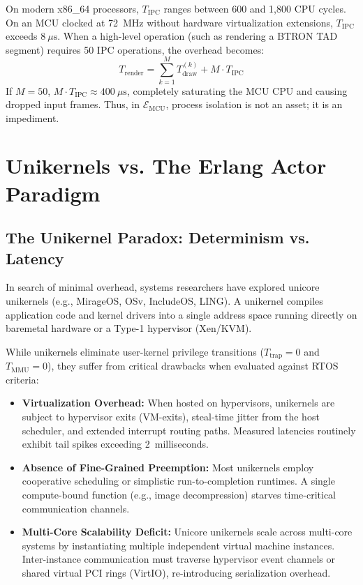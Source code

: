 \documentclass[10pt,journal,compsoc,twocolumn]{article}
\begin{document}
On modern x86\_64 processors, $T_{\text{IPC}}$ ranges between 600 and 1,800 CPU cycles. On an MCU clocked at 72~MHz without hardware virtualization extensions, $T_{\text{IPC}}$ exceeds $8\ \mu\text{s}$. When a high-level operation (such as rendering a BTRON TAD segment) requires 50 IPC operations, the overhead becomes:
\begin{equation}
T_{\text{render}} = \sum_{k=1}^{M} T_{\text{draw}}^{(k)} + M \cdot T_{\text{IPC}}
\end{equation}
If $M = 50$, $M \cdot T_{\text{IPC}} \approx 400\ \mu\text{s}$, completely saturating the MCU CPU and causing dropped input frames. Thus, in $\mathcal{E}_{\text{MCU}}$, process isolation is not an asset; it is an impediment.

\section{Unikernels vs. The Erlang Actor Paradigm}
\label{sec:erlang}

\subsection{The Unikernel Paradox: Determinism vs. Latency}
In search of minimal overhead, systems researchers have explored unicore unikernels (e.g., MirageOS, OSv, IncludeOS, LING). A unikernel compiles application code and kernel drivers into a single address space running directly on baremetal hardware or a Type-1 hypervisor (Xen/KVM).

While unikernels eliminate user-kernel privilege transitions ($T_{\text{trap}} = 0$ and $T_{\text{MMU}} = 0$), they suffer from critical drawbacks when evaluated against RTOS criteria:
\begin{itemize}[leftmargin=*]
    \item \textbf{Virtualization Overhead:} When hosted on hypervisors, unikernels are subject to hypervisor exits (VM-exits), steal-time jitter from the host scheduler, and extended interrupt routing paths. Measured latencies routinely exhibit tail spikes exceeding 2~milliseconds.
    \item \textbf{Absence of Fine-Grained Preemption:} Most unikernels employ cooperative scheduling or simplistic run-to-completion runtimes. A single compute-bound function (e.g., image decompression) starves time-critical communication channels.
    \item \textbf{Multi-Core Scalability Deficit:} Unicore unikernels scale across multi-core systems by instantiating multiple independent virtual machine instances. Inter-instance communication must traverse hypervisor event channels or shared virtual PCI rings (VirtIO), re-introducing serialization overhead.
\end{itemize}
\end{document}
